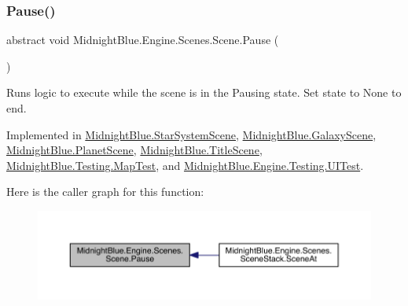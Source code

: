 \subsubsection{\texorpdfstring{Pause()}{Pause()}}
{\footnotesize\ttfamily abstract void Midnight\+Blue.\+Engine.\+Scenes.\+Scene.\+Pause (\begin{DoxyParamCaption}{ }\end{DoxyParamCaption})\hspace{0.3cm}{\ttfamily [pure virtual]}}



Runs logic to execute while the scene is in the Pausing state. Set state to None to end. 



Implemented in \hyperlink{class_midnight_blue_1_1_star_system_scene_a04e8bfcb31eebfd859c4bd543f0bb6f9}{Midnight\+Blue.\+Star\+System\+Scene}, \hyperlink{class_midnight_blue_1_1_galaxy_scene_aeb44afaeda2cccd225e64908bb76bee4}{Midnight\+Blue.\+Galaxy\+Scene}, \hyperlink{class_midnight_blue_1_1_planet_scene_abc077e1cd5f40879ca3af4224f0ff455}{Midnight\+Blue.\+Planet\+Scene}, \hyperlink{class_midnight_blue_1_1_title_scene_a046934bfa3290d443b58bcc1de0919db}{Midnight\+Blue.\+Title\+Scene}, \hyperlink{class_midnight_blue_1_1_testing_1_1_map_test_a7dba960137d634b15e4f4b7b3a86489f}{Midnight\+Blue.\+Testing.\+Map\+Test}, and \hyperlink{class_midnight_blue_1_1_engine_1_1_testing_1_1_u_i_test_ae7b12fd4ac0f143158c750c45e0775ce}{Midnight\+Blue.\+Engine.\+Testing.\+U\+I\+Test}.

Here is the caller graph for this function\+:
\nopagebreak
\begin{figure}[H]
\begin{center}
\leavevmode
\includegraphics[width=350pt]{class_midnight_blue_1_1_engine_1_1_scenes_1_1_scene_aeb3c4d9bea0177d21fbffcdabab660de_icgraph}
\end{center}
\end{figure}
\hypertarget{class_midnight_blue_1_1_engine_1_1_scenes_1_1_scene_ab7cd837b20785116007a4732d90bc548}{}\label{class_midnight_blue_1_1_engine_1_1_scenes_1_1_scene_ab7cd837b20785116007a4732d90bc548} 
